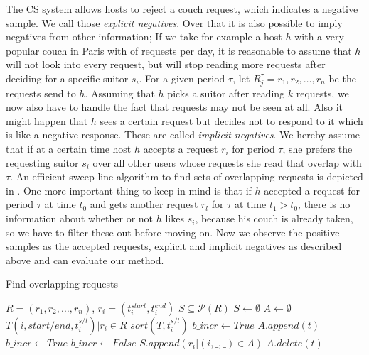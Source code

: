 \documentclass[11pt]{article}
\begin{document}
The CS system allows hosts to reject a couch request, which indicates a negative sample. We call those \textit{explicit negatives}. Over that it is also possible to imply negatives from other information; If we take for example a host $h$ with a very popular couch in Paris with  of requests per day, it is reasonable to assume that $h$ will not look into every request, but will stop reading more requests after deciding for a specific suitor $s_i$. For a given period $\tau$, let $R_{j}^{\tau} = r_1, r_2,\ldots,r_n$ be the requests send to $h$. Assuming that $h$ picks a suitor after reading $k$ requests, we now also have to handle the fact that requests may not be seen at all. Also it might happen that $h$ sees a certain request but decides not to respond to it which is like a negative response. These are called \textit{implicit negatives}. We hereby assume that if at a certain time host $h$ accepts a request $r_i$ for period $\tau$, she prefers the requesting suitor $s_i$ over all other users whose requests she read that overlap with $\tau$. An efficient sweep-line algorithm to find sets of overlapping requests is depicted in . One more important thing to keep in mind is that if $h$ accepted a request for period $\tau$ at time $t_0$ and gets another request $r_l$ for $\tau$ at time $t_1 > t_0$, there is no information about whether or not $h$ likes $s_i$, because his couch is already taken, so we have to filter these out before moving on. Now we observe the positive samples as the accepted requests, explicit and implicit negatives as described above and can evaluate our method.

\begin{algorithm}
\caption{Find overlapping requests}
\label{alg:overlap}
\begin{algorithmic} 
\REQUIRE $R = (r_1, r_2,\ldots,r_n)$, $r_i = (t_i^{start}, t_i^{end})$
\ENSURE $S\subseteq \mathcal{P}(R)$ 
\STATE $S \leftarrow \emptyset$
\STATE $A \leftarrow \emptyset$ 
\STATE $T {(i, start/end, t_i^{s/t}) |r_i \in R}$
\STATE $sort(T, t_i^{s/t})$ 
\STATE $b\_incr \leftarrow True$ 
\STATE $A.append(t)$
\STATE $b\_incr \leftarrow True$
\ELSE
{}
\STATE $b\_incr \leftarrow False$
\STATE $S.append({r_i | (i, \_, \_) \in A})$
\ENDIF
\STATE $A.delete(t)$
\ENDIF
\ENDFOR
\end{algorithmic}
\end{algorithm}
\end{document}
